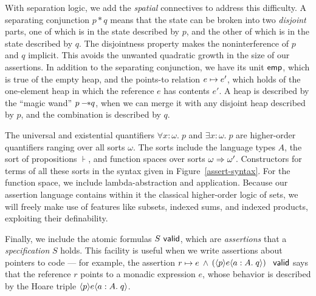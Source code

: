 \documentclass[preprint,natbib]{sigplanconf}
\begin{document}
With separation logic, we add the \emph{spatial} connectives to
address this difficulty. A separating conjunction $p * q$ means that
the state can be broken into two \emph{disjoint} parts, one of which
is in the state described by $p$, and the other of which is in the
state described by $q$. The disjointness property makes the
noninterference of $p$ and $q$ implicit. This avoids the unwanted
quadratic growth in the size of our assertions. In addition to the
separating conjunction, we have its unit $\mathsf{emp}$, which is true of the
empty heap, and the points-to relation $e \mapsto e'$, which holds
of the one-element heap in which the reference $e$ has contents
$e'$. A heap is described by the ``magic wand'' $p -\!\!* q$, when we
can merge it with any disjoint heap described by $p$, and the
combination is described by $q$.


The universal and existential quantifiers $\forall x:\omega.\;p$ and
$\exists x:\omega.\;p$ are higher-order quantifiers ranging over all
sorts $\omega$. The sorts include the language types $A$, the sort of
propositions $\assert$, and function spaces over sorts $\omega \Rightarrow
\omega'$. Constructors for terms of all these sorts in the syntax
given in Figure~\ref{assert-syntax}. For the function space, we
include lambda-abstraction and application. Because our assertion
language contains within it the classical higher-order logic of sets,
we will freely make use of features like subsets, indexed sums, and
indexed products, exploiting their definability.

Finally, we include the atomic formulas ${S}\mbox{\textsf{{ valid}}}$, which are
\emph{assertions} that a \emph{specification} $S$ holds. This facility
is useful when we write assertions about pointers to code --- for
example, the assertion $r \mapsto e$ $\land$
$(\langle{p}\rangle{e}\langle{a:A}.\;{q}\rangle)$ $\mbox{\textsf{{ valid}}}$ says that the reference $r$ points
to a monadic expression $e$, whose behavior is described by the Hoare
triple $\langle{p}\rangle{e}\langle{a:A}.\;{q}\rangle$.
\end{document}
